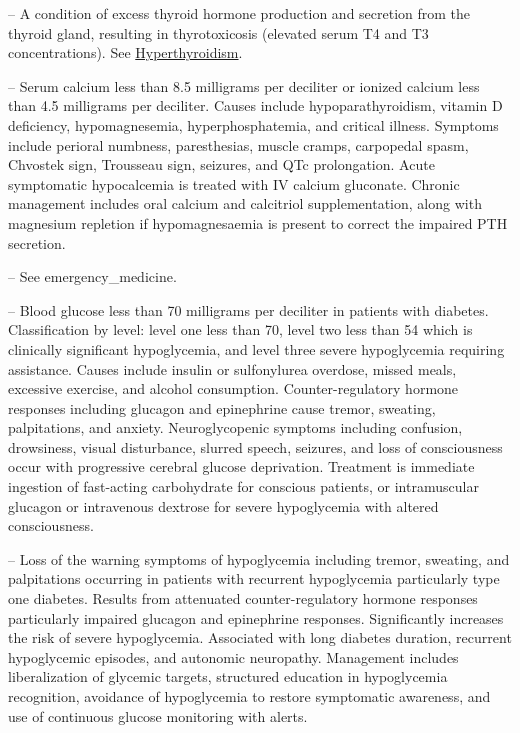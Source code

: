 -- A condition of excess thyroid hormone production and secretion from the thyroid gland, resulting in thyrotoxicosis (elevated serum T4 and T3 concentrations). See \hyperlink{Hyperthyroidism}{Hyperthyroidism}.

-- Serum calcium less than 8.5 milligrams per deciliter or ionized calcium less than 4.5 milligrams per deciliter. Causes include hypoparathyroidism, vitamin D deficiency, hypomagnesemia, hyperphosphatemia, and critical illness. Symptoms include perioral numbness, paresthesias, muscle cramps, carpopedal spasm, Chvostek sign, Trousseau sign, seizures, and QTc prolongation. Acute symptomatic hypocalcemia is treated with IV calcium gluconate. Chronic management includes oral calcium and calcitriol supplementation, along with magnesium repletion if hypomagnesaemia is present to correct the impaired PTH secretion.

-- See emergency\_medicine.

-- Blood glucose less than 70 milligrams per deciliter in patients with diabetes. Classification by level: level one less than 70, level two less than 54 which is clinically significant hypoglycemia, and level three severe hypoglycemia requiring assistance. Causes include insulin or sulfonylurea overdose, missed meals, excessive exercise, and alcohol consumption. Counter-regulatory hormone responses including glucagon and epinephrine cause tremor, sweating, palpitations, and anxiety. Neuroglycopenic symptoms including confusion, drowsiness, visual disturbance, slurred speech, seizures, and loss of consciousness occur with progressive cerebral glucose deprivation. Treatment is immediate ingestion of fast-acting carbohydrate for conscious patients, or intramuscular glucagon or intravenous dextrose for severe hypoglycemia with altered consciousness.

-- Loss of the warning symptoms of hypoglycemia including tremor, sweating, and palpitations occurring in patients with recurrent hypoglycemia particularly type one diabetes. Results from attenuated counter-regulatory hormone responses particularly impaired glucagon and epinephrine responses. Significantly increases the risk of severe hypoglycemia. Associated with long diabetes duration, recurrent hypoglycemic episodes, and autonomic neuropathy. Management includes liberalization of glycemic targets, structured education in hypoglycemia recognition, avoidance of hypoglycemia to restore symptomatic awareness, and use of continuous glucose monitoring with alerts.


